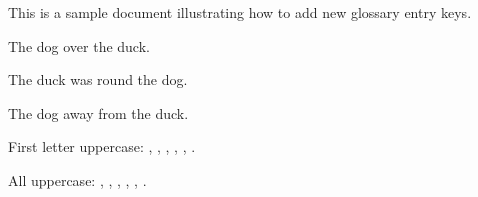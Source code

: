 \documentclass{article}
\begin{document}
This is a sample document illustrating how to add new glossary entry
keys.

The dog  over the duck.

The duck was  round the dog.

The dog  away from the duck.

First letter uppercase: , ,
, ,
, .

All uppercase: , ,
, ,
, .

\printglossaries
\end{document}

